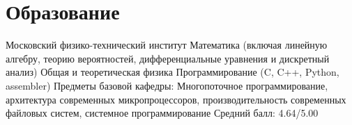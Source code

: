 \documentclass[letterpaper]{twentysecondcv} %
\begin{document}

\aboutme{} %







\makeprofile %





\section{Образование}

\begin{twenty} %
	{\newline Московский физико-технический институт}
	{\newline Математика (включая линейную алгебру, теорию вероятностей, дифференциальные уравнения и дискретный анализ)
\newline Общая и теоретическая физика
\newline Программирование (C, C++, Python, assembler)
\newline Предметы базовой кафедры: Многопоточное программирование, архитектура современных микропроцессоров, производительность современных файловых систем, системное программирование 
\newline
\newline Средний балл: 4.64/5.00}

\end{twenty}
\end{document}
